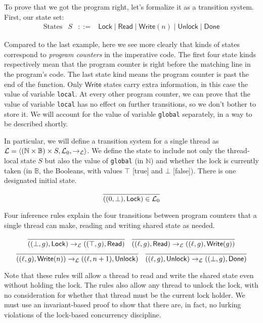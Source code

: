 \documentclass{amsbook}
\theoremstyle{definition}
\theoremstyle{remark}
\numberwithin{section}{chapter}
\numberwithin{equation}{chapter}
\begin{document}
\encoding
To prove that we got the program right, let's formalize it as a transition system.  First, our state set:
$$\begin{array}{rrcl}
  \textrm{States} & S &::=& \mathsf{Lock} \mid \mathsf{Read} \mid \mathsf{Write}(n) \mid \mathsf{Unlock} \mid \mathsf{Done}
\end{array}$$

Compared to the last example, here we see more clearly that kinds of states correspond to \emph{program counters} in the imperative code.
The first four state kinds respectively mean that the program counter is right before the matching line in the program's code.
The last state kind means the program counter is past the end of the function.
Only $\mathsf{Write}$ states carry extra information, in this case the value of variable \texttt{local}.
At every other program counter, we can prove that the value of variable \texttt{local} has no effect on further transitions, so we don't bother to store it.
We will account for the value of variable \texttt{global} separately, in a way to be described shortly.

In particular, we will define a transition system for a single thread as $\mathcal L = {\left \langle (\mathbb N \times \mathbb B) \times S, \mathcal L_0, \to_{\mathcal L} \right \rangle}$.
We define the state to include not only the thread-local state $S$ but also the value of \texttt{global} (in $\mathbb N$) and whether the lock is currently taken (in $\mathbb B$, the Booleans, with values $\top$ [true] and $\bot$ [false]).
There is one designated initial state.

$$\infer{((0, \bot), \mathsf{Lock}) \in \mathcal L_0}{}$$

Four inference rules explain the four transitions between program counters that a single thread can make, reading and writing shared state as needed.

$$\infer{((\bot, g), \mathsf{Lock}) \to_{\mathcal L} ((\top, g), \mathsf{Read})}{}
\quad \infer{((\ell, g), \mathsf{Read}) \to_{\mathcal L} ((\ell, g), \mathsf{Write}(g))}{}$$
$$\infer{((\ell, g), \mathsf{Write}(n)) \to_{\mathcal L} ((\ell, n+1), \mathsf{Unlock})}{}
\quad \infer{((\ell, g), \mathsf{Unlock}) \to_{\mathcal L} ((\bot, g), \mathsf{Done})}{}$$

\smallskip

Note that these rules will allow a thread to read and write the shared state even without holding the lock.
The rules also allow any thread to unlock the lock, with no consideration for whether that thread must be the current lock holder.
We must use an invariant-based proof to show that there are, in fact, no lurking violations of the lock-based concurrency discipline.
\end{document}
